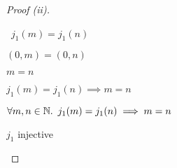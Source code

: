 \begin{prop}
\begin{proof}[Proof (ii)]
\begin{itemize}
\begin{itemize}
          \step
            \begin{itemize}
              \subp{\dagger}
                \Ass~$j_1(m) = j_1(n)$
                \marginnote{\Hyp}

              \step[\iffs]
                $(0,m) = (0,n)$

              \step[\iffs] $m = n$
            \end{itemize}
            \step[\imps]
              $j_1(m) = j_1(n) \implies m = n$
              \marginnote{$\imps$-\Intro}
        \end{itemize}

        \step[\imps]
          $\forall m,n\in\mathbb{N}\ldotp~j_1(m) = j_1(n) \implies m = n$
          \marginnote{$\forall$-\Intro}

        \step[\iffs]
          $j_1$ injective
          \qedhere
    \end{itemize}
  \end{proof}
\end{prop}

